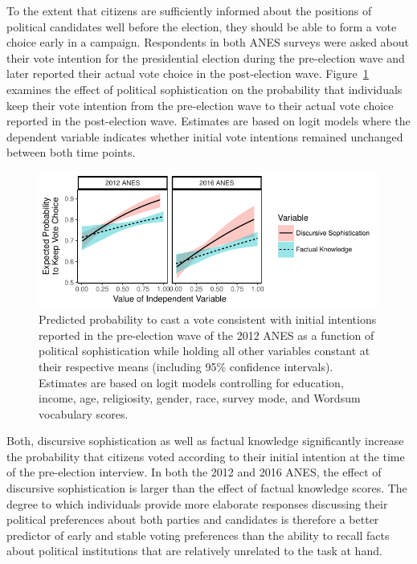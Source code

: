 \documentclass[12pt]{article}
\begin{document}
To the extent that citizens are sufficiently informed about the positions of political candidates well before the election, they should be able to form a vote choice early in a campaign. Respondents in both ANES surveys were asked about their vote intention for the presidential election during the pre-election wave and later reported their actual vote choice in the post-election wave. Figure~\ref{fig:prepost} examines the effect of political sophistication on the probability that individuals keep their vote intention from the pre-election wave to their actual vote choice reported in the post-election wave. Estimates are based on logit models where the dependent variable indicates whether initial vote intentions remained unchanged between both time points.

\begin{figure}[h]\centering
\includegraphics{../fig/prepost_exp.pdf}
\caption{Predicted probability to cast a vote consistent with initial intentions reported in the pre-election wave of the 2012 ANES as a function of political sophistication while holding all other variables constant at their respective means (including 95\% confidence intervals). Estimates are based on logit models controlling for education, income, age, religiosity, gender, race, survey mode, and Wordsum vocabulary scores.}\label{fig:prepost}
\end{figure}

Both, discursive sophistication as well as factual knowledge significantly increase the probability that citizens voted according to their initial intention at the time of the pre-election interview. In both the 2012 and 2016 ANES, the effect of discursive sophistication is larger than the effect of factual knowledge scores. The degree to which individuals provide more elaborate responses discussing their political preferences about both parties and candidates is therefore a better predictor of early and stable voting preferences than the ability to recall facts about political institutions that are relatively unrelated to the task at hand.
\end{document}
